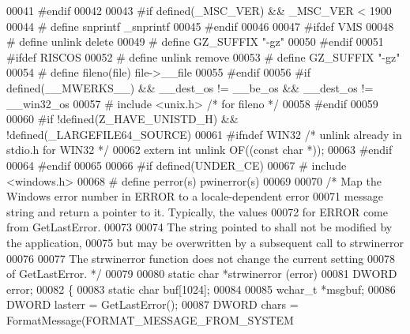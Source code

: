 \begin{DoxyCode}
00041 \textcolor{preprocessor}{#endif}
00042 
00043 \textcolor{preprocessor}{#if defined(\_MSC\_VER) && \_MSC\_VER < 1900}
00044 \textcolor{preprocessor}{#  define snprintf \_snprintf}
00045 \textcolor{preprocessor}{#endif}
00046 
00047 \textcolor{preprocessor}{#ifdef VMS}
00048 \textcolor{preprocessor}{#  define unlink delete}
00049 \textcolor{preprocessor}{#  define GZ\_SUFFIX "-gz"}
00050 \textcolor{preprocessor}{#endif}
00051 \textcolor{preprocessor}{#ifdef RISCOS}
00052 \textcolor{preprocessor}{#  define unlink remove}
00053 \textcolor{preprocessor}{#  define GZ\_SUFFIX "-gz"}
00054 \textcolor{preprocessor}{#  define fileno(file) file->\_\_file}
00055 \textcolor{preprocessor}{#endif}
00056 \textcolor{preprocessor}{#if defined(\_\_MWERKS\_\_) && \_\_dest\_os != \_\_be\_os && \_\_dest\_os != \_\_win32\_os}
00057 \textcolor{preprocessor}{#  include <unix.h>} \textcolor{comment}{/* for fileno */}
00058 \textcolor{preprocessor}{#endif}
00059 
00060 \textcolor{preprocessor}{#if !defined(Z\_HAVE\_UNISTD\_H) && !defined(\_LARGEFILE64\_SOURCE)}
00061 \textcolor{preprocessor}{#ifndef WIN32 }\textcolor{comment}{/* unlink already in stdio.h for WIN32 */}\textcolor{preprocessor}{}
00062   \textcolor{keyword}{extern} \textcolor{keywordtype}{int} unlink OF((\textcolor{keyword}{const} \textcolor{keywordtype}{char} *));
00063 \textcolor{preprocessor}{#endif}
00064 \textcolor{preprocessor}{#endif}
00065 
00066 \textcolor{preprocessor}{#if defined(UNDER\_CE)}
00067 \textcolor{preprocessor}{#  include <windows.h>}
00068 \textcolor{preprocessor}{#  define perror(s) pwinerror(s)}
00069 
00070 \textcolor{comment}{/* Map the Windows error number in ERROR to a locale-dependent error}
00071 \textcolor{comment}{   message string and return a pointer to it.  Typically, the values}
00072 \textcolor{comment}{   for ERROR come from GetLastError.}
00073 \textcolor{comment}{}
00074 \textcolor{comment}{   The string pointed to shall not be modified by the application,}
00075 \textcolor{comment}{   but may be overwritten by a subsequent call to strwinerror}
00076 \textcolor{comment}{}
00077 \textcolor{comment}{   The strwinerror function does not change the current setting}
00078 \textcolor{comment}{   of GetLastError.  */}
00079 
00080 \textcolor{keyword}{static} \textcolor{keywordtype}{char} *strwinerror (error)
00081      DWORD error;
00082 \{
00083     \textcolor{keyword}{static} \textcolor{keywordtype}{char} buf[1024];
00084 
00085     \textcolor{keywordtype}{wchar\_t} *msgbuf;
00086     DWORD lasterr = GetLastError();
00087     DWORD chars = FormatMessage(FORMAT\_MESSAGE\_FROM\_SYSTEM

\end{DoxyCode}
